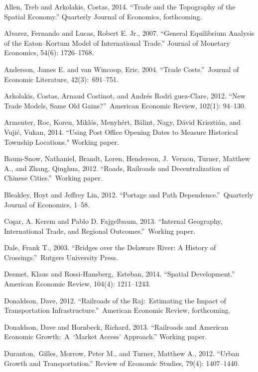\documentclass[12pt]{article}
\begin{document}
\begin{thebibliography}{99}
\bibitem{} Allen, Treb and Arkolakis, Costas, 2014. ``Trade and the Topography of
the Spatial Economy.'' Quarterly Journal of Economics, forthcoming.

\bibitem{} Alvarez, Fernando and Lucas, Robert E. Jr., 2007. ``General
Equilibrium Analysis of the Eaton--Kortum Model of International Trade.''
Journal of Monetary Economics, 54(6): 1726--1768.

\bibitem{} Anderson, James E. and van Wincoop, Eric, 2004. ``Trade Costs.''\
Journal of Economic Literature, 42(3):\ 691--751.

\bibitem{} Arkolakis, Costas, Arnaud Costinot, and Andr\'{e}s Rodr\'{\i}%
guez-Clare, 2012. \textquotedblleft New Trade Models, Same Old
Gains?\textquotedblright \ American Economic Review, 102(1): 94--130.

\bibitem{} Armenter, Roc, Koren, Mikl\'{o}s, Menyh\'{e}rt, B\'{a}lint, Nagy, D\'{a}vid Kriszti\'{a}n, and Vuji\'{c}, Vukan, 2014. ``Using Post Office Opening Dates to Measure Historical Township Locations." Working paper.

\bibitem{} Baum-Snow, Nathaniel, Brandt, Loren, Henderson, J.\ Vernon,
Turner, Matthew A., and Zhang, Qinghua, 2012. ``Roads, Railroads and
Decentralization of Chinese Cities.''\ Working paper.

\bibitem{} Bleakley, Hoyt and Jeffrey Lin, 2012. \textquotedblleft Portage
and Path Dependence.''\ Quarterly Journal of Economics, 1--58.

\bibitem{} Co\c{s}ar, A. Kerem and Pablo D. Fajgelbaum, 2013.
\textquotedblleft Internal Geography, International Trade, and Regional
Outcomes.\textquotedblright \ Working paper.

\bibitem{} Dale, Frank T., 2003. \textquotedblleft Bridges over the Delaware
River: A History of Crossings.\textquotedblright \ Rutgers University Press.

\bibitem{} Desmet, Klaus and Rossi-Hansberg,\ Esteban, 2014. ``Spatial
Development.'' American Economic Review, 104(4): 1211--1243.

\bibitem{} Donaldson, Dave, 2012. ``Railroads of the Raj:\ Estimating the
Impact of Transportation Infrastructure.''\ American Economic Review,
forthcoming.

\bibitem{} Donaldson, Dave and Hornbeck, Richard, 2013. ``Railroads and
American Economic Growth:\ A\ `Market Access' Approach.'' Working paper.

\bibitem{} Duranton,\ Gilles, Morrow, Peter M., and Turner, Matthew A.,
2012. ``Urban Growth and Transportation.'' Review of Economic Studies, 79(4):
1407--1440.


\end{thebibliography}
\end{document}
